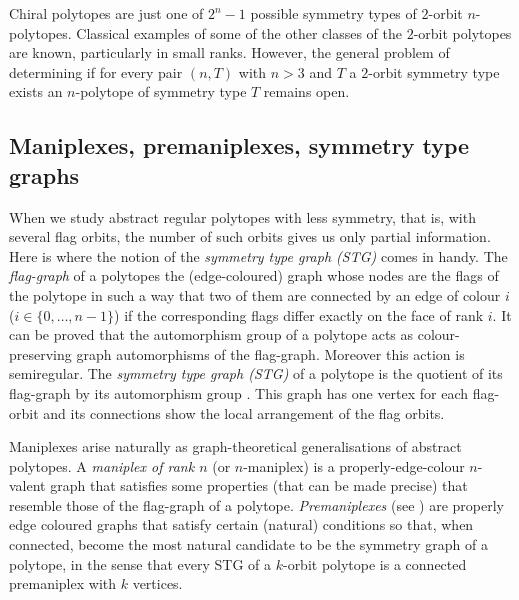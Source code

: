 \documentclass[a4paper,12pt,english]{article}
\begin{document}
Chiral polytopes are just one of $2^{n}-1$ possible symmetry types of $2$-orbit $n$-polytopes.
Classical examples of some of the other classes of the $2$-orbit polytopes are known, particularly in small ranks.
However, the general problem of determining if for every pair $(n,T)$ with $n>3$ and $T$ a $2$-orbit symmetry type  exists an $n$-polytope of symmetry type $T$ remains open.

\subsection*{Maniplexes, premaniplexes, symmetry type graphs}

When we study abstract regular polytopes with less symmetry, that is, with several flag orbits, the number of such orbits gives us only  partial information. 
Here is where the notion of the \emph{symmetry type graph (STG)} comes in handy. 
The \emph{flag-graph} of a polytopes the (edge-coloured) graph whose nodes are the flags of the polytope in such a way that two of them are connected by an edge of colour $i$ ($i \in \{0, \dots, n-1\}$) if the corresponding flags differ exactly on the face of rank $i$.
It can be proved that the automorphism group of a polytope acts as colour-preserving graph automorphisms of the flag-graph. 
Moreover this action is semiregular.
The \emph{symmetry type graph (STG)} of a polytope is the quotient of its flag-graph by its automorphism group
\cite{CunDelHuTo2015_SymmetryTypeGraphs}.
This graph has one vertex for each flag-orbit and its connections show the local arrangement of the flag orbits. 

Maniplexes arise naturally as graph-theoretical generalisations of abstract polytopes. 
A \emph{maniplex of rank $n$} (or $n$-maniplex) is a properly-edge-colour $n$-valent graph that satisfies some properties (that can be made precise) that resemble those of the flag-graph of a polytope.
\emph{Premaniplexes} (see \cite{HubaMocMon2023_VoltageOperationsManiplexes,HubarMocha2023_AllPolytopesAre}) are properly edge coloured graphs that satisfy certain (natural) conditions so that, when connected, become the most natural candidate to be the symmetry graph of a polytope, in the sense that every STG of a $k$-orbit polytope is a connected premaniplex with $k$ vertices.

\end{document}
